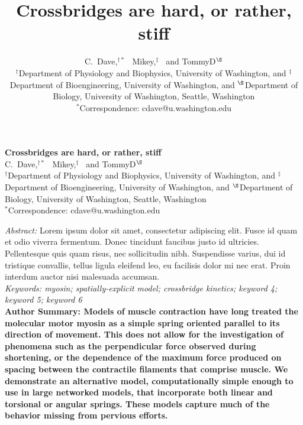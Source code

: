 \documentclass[
	11pt]{article}
\title{Crossbridges are hard, or rather, stiff}
\author{
	C.~Dave,$^{\dagger \ast}$~
	Mikey,$^\ddagger$~
	and TommyD$^\S$\\ 
	\small 
	$^\dagger$Department of Physiology and Biophysics, University of Washington, and 
	$^\ddagger$Department of Bioengineering, University of Washington, and 
	$^\S$Department of Biology, University of Washington, Seattle, Washington \\
	$^\ast$Correspondence: cdave@u.washington.edu
	\normalsize
}
\date{}
\begin{document}
{\selectfont

\LARGE
\noindent \textbf{Crossbridges are hard, or rather, stiff }\\

	\large
	\noindent C.~Dave,$^{\dagger \ast}$~
	Mikey,$^\ddagger$~
	and TommyD$^\S$\\ 
	\small 
	$^\dagger$Department of Physiology and Biophysics, University of Washington, and 
	$^\ddagger$Department of Bioengineering, University of Washington, and 
	$^\S$Department of Biology, University of Washington, Seattle, Washington \\
	$^\ast$Correspondence: cdave@u.washington.edu \\
	\normalsize


\noindent \emph{Abstract:} 
Lorem ipsum dolor sit amet, consectetur adipiscing elit. Fusce id quam et odio viverra fermentum. Donec tincidunt faucibus justo id ultricies. Pellentesque quis quam risus, nec sollicitudin nibh. Suspendisse varius, dui id tristique convallis, tellus ligula eleifend leo, eu facilisis dolor mi nec erat. Proin interdum auctor nisi malesuada accumsan.  \\[.5em]
{\footnotesize \emph{
Keywords: myosin; spatially-explicit model; crossbridge kinetics; keyword 4; keyword 5; keyword 6}} \\[.5em]
 {\footnotesize \textbf{
 Author Summary: Models of muscle contraction have long treated the molecular motor myosin as a simple spring oriented parallel to its direction of movement. This does not allow for the investigation of phenomena such as the perpendicular force observed during shortening, or the dependence of the maximum force produced on spacing between the contractile filaments that comprise muscle. We demonstrate an alternative model, computationally simple enough to use in large networked models, that incorporate both linear and torsional or angular springs. These models capture much of the behavior missing from pervious efforts.}}} \\
\end{document}
